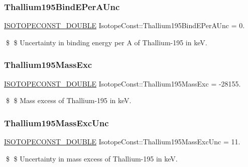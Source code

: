 \subsubsection{\texorpdfstring{Thallium195\+Bind\+E\+Per\+A\+Unc}{Thallium195BindEPerAUnc}}
{\footnotesize\ttfamily \mbox{\hyperlink{group___isotope_const-_macros_ga8f45a7272ce02c0b4c65c44636ed719a}{I\+S\+O\+T\+O\+P\+E\+C\+O\+N\+S\+T\+\_\+\+D\+O\+U\+B\+LE}} Isotope\+Const\+::\+Thallium195\+Bind\+E\+Per\+A\+Unc = 0.}

\$ \$ Uncertainty in binding energy per A of Thallium-\/195 in keV. \mbox{\label{group___isotope_const-_thallium-_tl195_gafe16fcfdbad38002ab0dd792dd683779}} 
\subsubsection{\texorpdfstring{Thallium195\+Mass\+Exc}{Thallium195MassExc}}
{\footnotesize\ttfamily \mbox{\hyperlink{group___isotope_const-_macros_ga8f45a7272ce02c0b4c65c44636ed719a}{I\+S\+O\+T\+O\+P\+E\+C\+O\+N\+S\+T\+\_\+\+D\+O\+U\+B\+LE}} Isotope\+Const\+::\+Thallium195\+Mass\+Exc = -\/28155.}

\$ \$ Mass excess of Thallium-\/195 in keV. \mbox{\label{group___isotope_const-_thallium-_tl195_ga4fd0b906cf7f1a956b3d22a9c398dfd9}} 
\subsubsection{\texorpdfstring{Thallium195\+Mass\+Exc\+Unc}{Thallium195MassExcUnc}}
{\footnotesize\ttfamily \mbox{\hyperlink{group___isotope_const-_macros_ga8f45a7272ce02c0b4c65c44636ed719a}{I\+S\+O\+T\+O\+P\+E\+C\+O\+N\+S\+T\+\_\+\+D\+O\+U\+B\+LE}} Isotope\+Const\+::\+Thallium195\+Mass\+Exc\+Unc = 11.}

\$ \$ Uncertainty in mass excess of Thallium-\/195 in keV. \mbox{\label{group___isotope_const-_thallium-_tl195_ga99dc57bbbe8e93b7950864f7dd159fee}} 
